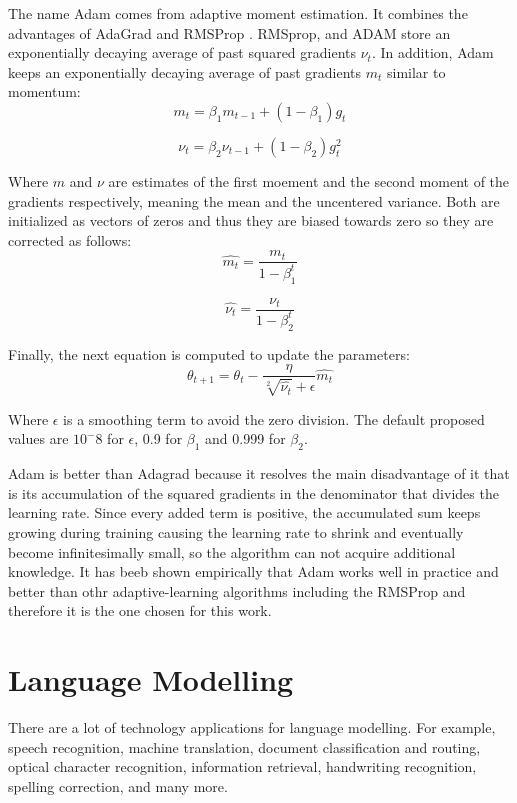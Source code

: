  
The name Adam comes from adaptive moment estimation. It combines the advantages of AdaGrad and RMSProp \cite{kingma2014adam}. RMSprop, and ADAM  store an exponentially decaying average of past squared gradients $\nu_t$. In addition, Adam keeps an exponentially decaying average of past gradients $m_t$ similar to momentum:
\begin{equation}
m_t=\beta_1 m_{t-1} + (1-\beta_1)g_t
\end{equation}

\begin{equation}
\nu_t=\beta_2 \nu_{t-1} + (1-\beta_2)g^2_t
\end{equation}

 Where $m$ and $\nu$ are estimates of the first moement and the second moment of the gradients respectively, meaning the mean and the uncentered variance. Both are initialized as vectors of zeros and thus they are biased towards zero so they are corrected as follows:
\begin{equation}
\hat{m_t}=\frac{m_t}{1-\beta^t_1}
\end{equation}

\begin{equation}
\hat{\nu_t}=\frac{\nu_t}{1-\beta^t_2}
\end{equation}

Finally, the next equation is computed to update the parameters:
\begin{equation}
\theta_{t+1}=\theta_t-\frac{\eta}{\sqrt[2]{\hat{\nu_t}} + \epsilon} \hat{m_t} 
\end{equation}

Where $\epsilon$ is a smoothing term to avoid the zero division. The default proposed values are $10^-8$ for $\epsilon$, 0.9 for $\beta_1$ and 0.999 for $\beta_2$.

Adam is better than Adagrad because it resolves the main disadvantage of it that is its accumulation of the squared gradients in the denominator that divides the learning rate\cite{duchi2011adaptive}. Since every added term is positive, the accumulated sum keeps growing during training causing the learning rate to shrink and eventually become infinitesimally small, so the algorithm can not acquire additional knowledge\cite{ruder2016overview}. It has beeb shown empirically that Adam works well in practice and better than othr adaptive-learning algorithms including the RMSProp and therefore it is the one chosen for this work.

\section{Language Modelling}
There are a lot of technology applications for language modelling. For example, speech recognition, machine translation, document classification and routing, optical character recognition, information retrieval, handwriting recognition, spelling correction, and many more.

